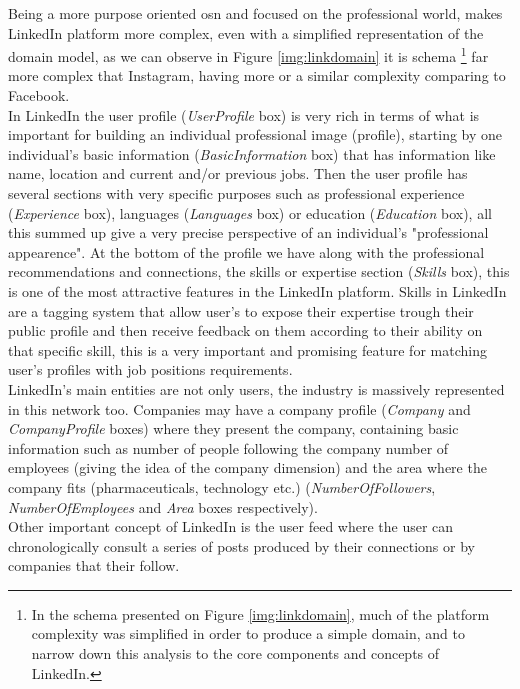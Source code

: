 \indent Being a more purpose oriented \gls{osn} and focused on the professional
world, makes LinkedIn platform more complex, even with a simplified representation of the domain model, as we can observe in Figure \ref{img:linkdomain} it is schema
\footnote{\indent In the schema presented on Figure \ref{img:linkdomain}, much of the platform complexity was simplified in order to produce a simple domain, and to narrow
down this analysis to the core components and concepts of LinkedIn.}
far more complex that Instagram, having more or a similar complexity comparing to Facebook.\\
\indent In LinkedIn the user profile (\textit{UserProfile} box) is very rich in terms of what is important for building an individual professional image (profile),
starting by one individual's basic information (\textit{BasicInformation} box) that has information like name, location and current and/or previous jobs. Then
the user profile has several sections with very specific purposes such as professional experience (\textit{Experience} box), languages (\textit{Languages} box) or
education (\textit{Education} box), all this summed up give a very precise perspective of an individual's "professional appearence". At the bottom of the profile
we have along with the professional recommendations and connections, the skills or expertise section (\textit{Skills} box), this is one of the most attractive features
in the LinkedIn platform. Skills in LinkedIn are a tagging system that allow user's to expose their expertise trough their public profile and then receive feedback
on them according to their ability on that specific skill, this is a very important and promising feature for matching user's profiles with
job positions requirements.\\
\indent LinkedIn's main entities are not only users, the industry is massively represented in this network too. Companies may have a company profile
(\textit{Company} and \textit{CompanyProfile} boxes) where they present the company, containing basic information such as number of people following the company
number of employees (giving the idea of the company dimension) and the area where the company fits (pharmaceuticals, technology etc.) (\textit{NumberOfFollowers},
\textit{NumberOfEmployees} and \textit{Area} boxes respectively).\\
\indent Other important concept of LinkedIn is the user feed where the user can chronologically consult a series of posts produced by their connections
or by companies that their follow.

